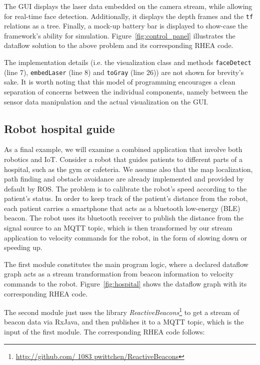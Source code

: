 \documentclass[sigplan,screen]{acmart}
\begin{document}
The GUI displays the laser data embedded on the camera stream, while allowing
for real-time face detection. Additionally, it displays the depth frames and the
\texttt{tf} relations as a tree. Finally, a mock-up battery bar is displayed to
show-case the framework's ability for simulation. Figure~\ref{fig:control_panel}
illustrates the dataflow solution to the above problem and its corresponding
\textsc{RHEA} code.
%

The implementation details (i.e. the visualization class and methods
\texttt{faceDetect} (line 7), \texttt{embedLaser} (line 8) and
\texttt{toGray} (line 26)) are not shown for brevity's sake. It is worth noting
that this model of programming encourages a clean separation of concerns between the
individual components, namely between the sensor data manipulation and the
actual visualization on the GUI.

\subsection{Robot hospital guide}

As a final example, we will examine a combined application that involve both robotics and IoT.
Consider a robot that guides patients to different parts of a hospital, such as the gym or
cafeteria. We assume also that the map localization, path finding and obstacle
avoidance are already implemented and provided by default by ROS. The problem
is to calibrate the robot's speed according to the patient's status.
%
In order to keep track of the patient's distance from the robot, each patient carries a
smartphone that acts as a bluetooth low-energy (BLE) beacon. The robot uses its
bluetooth receiver to publish the distance from the signal source to an
MQTT topic, which is then transformed by our stream application to velocity
commands for the robot, in the form of slowing down or speeding up.

The first module constitutes the main program logic, where a declared dataflow
graph acts as a stream transformation from beacon information to velocity
commands to the robot. Figure~\ref{fig:hospital} shows the dataflow graph with
its corresponding \textsc{RHEA} code.


The second module just uses the library \textit{ReactiveBeacons}\footnote{\url{http://github.com/ 1083 pwittchen/ReactiveBeacons}}
to get a stream of beacon data via RxJava, and then publishes it to a MQTT topic,
which is the input of the first module. The corresponding \textsc{RHEA} code
follows:
\end{document}
